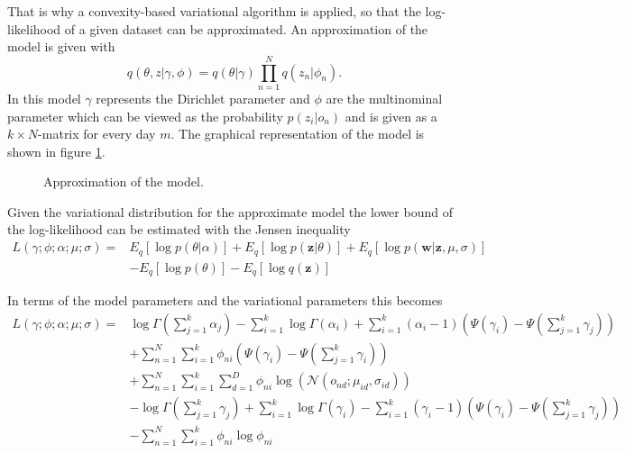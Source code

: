 That is why a convexity-based variational algorithm is applied, so that the log-likelihood of a given dataset can be approximated. 
An approximation of the model is given with 
  \begin{equation}
   q(\theta,z|\gamma,\phi) = q(\theta|\gamma) \prod_{n=1}^N q(z_n|\phi_n).
  \end{equation}
In this model $\gamma$ represents the Dirichlet parameter and $\phi$ are the multinominal parameter which can be viewed as the probability $p(z_i|o_n)$ and is given as a $k \times N$-matrix for every day $m$. The graphical representation of the model is shown in figure \ref{fig:ModelApprox}.
  
 
\begin{figure}[h!]
\centering
\def\svgwidth{0.4\textwidth}

\caption{Approximation of the model.}
\label{fig:ModelApprox}
\end{figure}
 
  
  
  
  Given the variational distribution for the approximate model the lower bound of the log-likelihood can be estimated with the Jensen inequality
  \begin{equation}
   \begin{split}
    L(\gamma;\phi;\alpha;\mu;\sigma) =& E_q[\log p(\theta|\alpha)] + E_q[\log p(\textbf{z}|\theta)] + E_q[\log p(\textbf{w}|\textbf{z},\mu,\sigma)] \\
   & -E_q[\log p(\theta)] - E_q[\log q(\textbf{z})]
   \end{split}
  \end{equation}

In terms of the model parameters and the variational parameters this becomes
\begin{equation}
  \begin{split}
 L(\gamma;\phi;\alpha;\mu;\sigma) =& \log \Gamma (\sum_{j=1}^k \alpha_j) - \sum_{i=1}^k \log \Gamma(\alpha_i) + \sum_{i=1}^k (\alpha_i-1)(\Psi(\gamma_i)-\Psi(\sum_{j=1}^k \gamma_j)) \\
 & + \sum_{n=1}^N \sum_{i=1}^k \phi_{ni} (\Psi(\gamma_i)-\Psi(\sum_{j=1}^k \gamma_i)) \\
  & + \sum_{n=1}^N \sum_{i=1}^k \sum_{d=1}^D \phi_{ni} \log( \mathcal{N}(o_{nd};\mu_{id},\sigma_{id})) \\
  & - \log \Gamma (\sum_{j=1}^k \gamma_j) + \sum_{i=1}^k \log \Gamma (\gamma_i) - \sum_{i=1}^k (\gamma_i -1)(\Psi(\gamma_i)-\Psi(\sum_{j=1}^k \gamma_j)) \\
 & - \sum_{n=1}^N \sum_{i=1}^k \phi_{ni} \log \phi_{ni}
  \end{split}
  \label{eq:likeli}
\end{equation}

